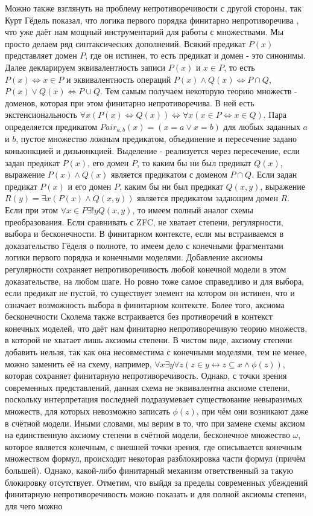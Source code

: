 \documentclass[12pt]{article}
\begin{document}
Можно также взглянуть на проблему непротиворечивости с другой стороны, так Курт Гёдель показал, что логика первого порядка финитарно непротиворечива \cite{godel-compactness-logic}, что уже даёт нам мощный инструментарий для работы с множествами. Мы просто делаем ряд синтаксических дополнений. Всякий предикат $P(x)$ представляет домен $P$, где он истинен, то есть предикат и домен - это синонимы. Далее декларируем эквивалентность записи $P(x)$ и $x \in P$, то есть $P(x) \Leftrightarrow x \in P$ и эквивалентность операций $P(x) \wedge Q(x) \Leftrightarrow P \cap Q$, $P(x) \vee Q(x) \Leftrightarrow P \cup Q$. Тем самым получаем некоторую теорию множеств - доменов, которая при этом финитарно непротиворечива. В ней есть экстенсиональность $\forall x (P(x) \Leftrightarrow Q(x)) \Leftrightarrow \forall x (x \in P \Leftrightarrow x \in Q)$. Пара определяется предикатом $Pair_{a, b}(x) = (x = a \vee x = b)$ для любых заданных $a$ и $b$, пустое множество ложным предикатом, объединение и пересечение задано коньюнкцией и дизьюнкцией. Выделение - реализуется через пересечение, если задан предикат $P(x)$, его домен $P$, то каким бы ни был предикат $Q(x)$, выражение $P(x) \wedge Q(x)$ является предикатом с доменом $P \cap Q$. Если задан предикат $P(x)$ и его домен $P$, каким бы ни был предикат $Q(x, y)$, выражение $R(y) = \exists x (P(x) \wedge Q(x, y))$ является предикатом задающим домен $R$. Если при этом $\forall x \in P \exists! y Q(x, y)$, то имеем полный аналог схемы преобразования. Если сравнивать с ZFC, не хватает степени, регулярности, выбора и бесконечности. В финитарном контексте, если мы встраиваемся в доказательство Гёделя о полноте, то имеем дело с конечными фрагментами логики первого порядка и конечными моделями. Добавление аксиомы регулярности сохраняет непротиворечивость любой конечной модели в этом доказательстве, на любом шаге. Но ровно тоже самое справедливо и для выбора, если предикат не пустой, то существует элемент на котором он истинен, что и означает возможность выбора в финитарном контексте. Более того, аксиома бесконечности Сколема также встраивается без противоречий в контекст конечных моделей, что даёт нам финитарно непротиворечивую теорию множеств, в которой не хватает лишь аксиомы степени. В чистом виде, аксиому степени добавить нельзя, так как она несовместима с конечными моделями, тем не менее, можно заменить её на схему, например, $\forall x \exists y \forall z (z \in y \leftrightarrow z \subseteq x \wedge \phi(z))$, которая сохраняет финитарную непротиворечивость. Однако, с точки зрения современных представлений, данная схема не эквивалентна аксиоме степени, поскольку интерпретация последней подразумевает существование невыразимых множеств, для которых невозможно записать $\phi(z)$, при чём они возникают даже в счётной модели. Иными словами, мы верим в то, что при замене схемы аксиом на единственную аксиому степени в счётной модели, бесконечное множество $\omega$, которое является конечным, с внешней точки зрения, где описывается конечным множеством формул, происходит некоторая разблокировка части формул (причём большей). Однако, какой-либо финитарный механизм ответственный за такую блокировку отсутствует. Отметим, что выйдя за пределы современных убеждений финитарную непротиворечивость можно показать и для полной аксиомы степени, для чего можно 
\end{document}
